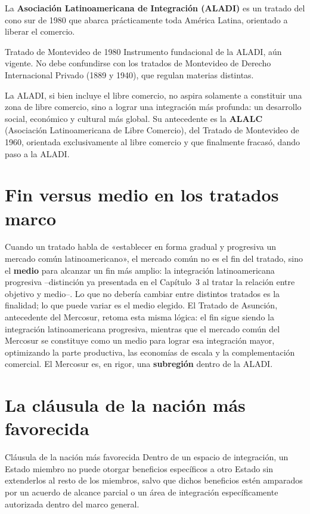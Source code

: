 \documentclass[12pt,oneside]{book}
\begin{document}
La \textbf{Asociación Latinoamericana de Integración (ALADI)} es un tratado del cono sur de 1980 que abarca prácticamente toda América Latina, orientado a liberar el comercio.

\begin{normacitada}{Tratado de Montevideo de 1980}
Instrumento fundacional de la ALADI, aún vigente. No debe confundirse con los tratados de Montevideo de Derecho Internacional Privado (1889 y 1940), que regulan materias distintas.
\end{normacitada}

La ALADI, si bien incluye el libre comercio, no aspira solamente a constituir una zona de libre comercio, sino a lograr una integración más profunda: un desarrollo social, económico y cultural más global. Su antecedente es la \textbf{ALALC} (Asociación Latinoamericana de Libre Comercio), del Tratado de Montevideo de 1960, orientada exclusivamente al libre comercio y que finalmente fracasó, dando paso a la ALADI.

\section{Fin versus medio en los tratados marco}

Cuando un tratado habla de «establecer en forma gradual y progresiva un mercado común latinoamericano», el mercado común no es el fin del tratado, sino el \textbf{medio} para alcanzar un fin más amplio: la integración latinoamericana progresiva --distinción ya presentada en el Capítulo~3 al tratar la relación entre objetivo y medio--. Lo que no debería cambiar entre distintos tratados es la finalidad; lo que puede variar es el medio elegido. El Tratado de Asunción, antecedente del Mercosur, retoma esta misma lógica: el fin sigue siendo la integración latinoamericana progresiva, mientras que el mercado común del Mercosur se constituye como un medio para lograr esa integración mayor, optimizando la parte productiva, las economías de escala y la complementación comercial. El Mercosur es, en rigor, una \textbf{subregión} dentro de la ALADI.

\section{La cláusula de la nación más favorecida}

\begin{definicion}{Cláusula de la nación más favorecida}
Dentro de un espacio de integración, un Estado miembro no puede otorgar beneficios específicos a otro Estado sin extenderlos al resto de los miembros, salvo que dichos beneficios estén amparados por un acuerdo de alcance parcial o un área de integración específicamente autorizada dentro del marco general.
\end{definicion}
\end{document}
